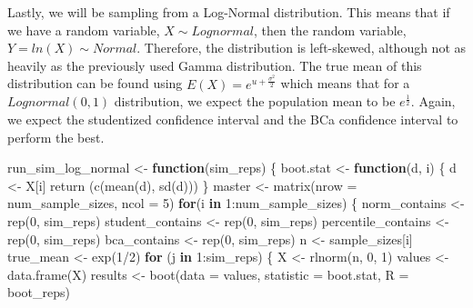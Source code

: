 \documentclass[12pt]{article}
\newenvironment{Shaded}{\begin{snugshade}}{\end{snugshade}}
\newcommand{\AttributeTok}[1]{\textcolor[rgb]{0.77,0.63,0.00}{#1}}
\newcommand{\ControlFlowTok}[1]{\textcolor[rgb]{0.13,0.29,0.53}{\textbf{#1}}}
\newcommand{\DecValTok}[1]{\textcolor[rgb]{0.00,0.00,0.81}{#1}}
\newcommand{\FunctionTok}[1]{\textcolor[rgb]{0.00,0.00,0.00}{#1}}
\newcommand{\NormalTok}[1]{#1}
\newcommand{\OtherTok}[1]{\textcolor[rgb]{0.56,0.35,0.01}{#1}}
\newcommand{\SpecialCharTok}[1]{\textcolor[rgb]{0.00,0.00,0.00}{#1}}
\begin{document}
Lastly, we will be sampling from a Log-Normal distribution. This means
that if we have a random variable, \(X \sim Lognormal\), then the random
variable, \(Y = ln(X) \sim Normal\). Therefore, the distribution is
left-skewed, although not as heavily as the previously used Gamma
distribution. The true mean of this distribution can be found using
\(E(X) = e^{u+\frac{\sigma^2}{2}}\) which means that for a
\(Lognormal(0,1)\) distribution, we expect the population mean to be
\(e^{\frac{1}{2}}\). Again, we expect the studentized confidence
interval and the BCa confidence interval to perform the best.

\begin{Shaded}
\begin{Highlighting}[]
\NormalTok{run\_sim\_log\_normal }\OtherTok{\textless{}{-}} \ControlFlowTok{function}\NormalTok{(sim\_reps) \{}
\NormalTok{  boot.stat }\OtherTok{\textless{}{-}} \ControlFlowTok{function}\NormalTok{(d, i) \{}
\NormalTok{    d }\OtherTok{\textless{}{-}}\NormalTok{ X[i]}
    \FunctionTok{return}\NormalTok{ (}\FunctionTok{c}\NormalTok{(}\FunctionTok{mean}\NormalTok{(d), }\FunctionTok{sd}\NormalTok{(d)))}
\NormalTok{  \}}
\NormalTok{  master }\OtherTok{\textless{}{-}} \FunctionTok{matrix}\NormalTok{(}\AttributeTok{nrow =}\NormalTok{ num\_sample\_sizes, }\AttributeTok{ncol =} \DecValTok{5}\NormalTok{)}
  \ControlFlowTok{for}\NormalTok{(i }\ControlFlowTok{in} \DecValTok{1}\SpecialCharTok{:}\NormalTok{num\_sample\_sizes) \{}
\NormalTok{    norm\_contains }\OtherTok{\textless{}{-}} \FunctionTok{rep}\NormalTok{(}\DecValTok{0}\NormalTok{, sim\_reps)}
\NormalTok{    student\_contains }\OtherTok{\textless{}{-}} \FunctionTok{rep}\NormalTok{(}\DecValTok{0}\NormalTok{, sim\_reps)}
\NormalTok{    percentile\_contains }\OtherTok{\textless{}{-}} \FunctionTok{rep}\NormalTok{(}\DecValTok{0}\NormalTok{, sim\_reps)}
\NormalTok{    bca\_contains }\OtherTok{\textless{}{-}} \FunctionTok{rep}\NormalTok{(}\DecValTok{0}\NormalTok{, sim\_reps)}
\NormalTok{    n }\OtherTok{\textless{}{-}}\NormalTok{ sample\_sizes[i]}
\NormalTok{    true\_mean }\OtherTok{\textless{}{-}} \FunctionTok{exp}\NormalTok{(}\DecValTok{1}\SpecialCharTok{/}\DecValTok{2}\NormalTok{)}
    \ControlFlowTok{for}\NormalTok{ (j }\ControlFlowTok{in} \DecValTok{1}\SpecialCharTok{:}\NormalTok{sim\_reps) \{}
\NormalTok{      X }\OtherTok{\textless{}{-}} \FunctionTok{rlnorm}\NormalTok{(n, }\DecValTok{0}\NormalTok{, }\DecValTok{1}\NormalTok{)}
\NormalTok{      values }\OtherTok{\textless{}{-}} \FunctionTok{data.frame}\NormalTok{(X)}
\NormalTok{      results }\OtherTok{\textless{}{-}} \FunctionTok{boot}\NormalTok{(}\AttributeTok{data =}\NormalTok{ values, }\AttributeTok{statistic =}\NormalTok{ boot.stat, }\AttributeTok{R =}\NormalTok{ boot\_reps)}

\end{Highlighting}
\end{Shaded}
\end{document}
